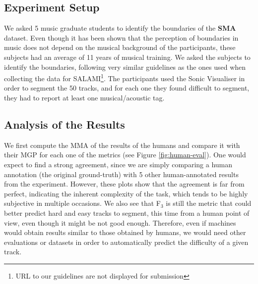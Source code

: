 \documentclass{article}
\begin{document}
\subsection{Experiment Setup}

We asked 5 music graduate students to identify the boundaries of the \textbf{SMA} dataset.
Even though it has been shown that the perception of boundaries in music does not depend on the musical background of the participants\cite{Bruderer2009}, these subjects had an average of 11 years of musical training.
We asked the subjects to identify the boundaries, following very similar guidelines as the ones used when collecting the data for SALAMI\cite{Smith2011}\footnote{URL to our guidelines are not displayed for submission}.
The participants used the Sonic Visualiser\cite{Cannam2006} in order to segment the 50 tracks, and for each one they found difficult to segment, they had to report at least one musical/acoustic tag.

\subsection{Analysis of the Results}

We first compute the MMA of the results of the humans and compare it with their MGP for each one of the metrics (see Figure \ref{fig:human-eval}).
One would expect to find a strong agreement, since we are simply comparing a human annotation (the original ground-truth) with 5 other human-annotated results from the experiment.
However, these plots show that the agreement is far from perfect, indicating the inherent complexity of the task, which tends to be highly subjective in multiple occasions.
We also see that F$_3$ is still the metric that could better predict hard and easy tracks to segment, this time from a human point of view, even though it might be not good enough.
Therefore, even if machines would obtain results similar to those obtained by humans, we would need other evaluations or datasets in order to automatically predict the difficulty of a given track.
\end{document}
